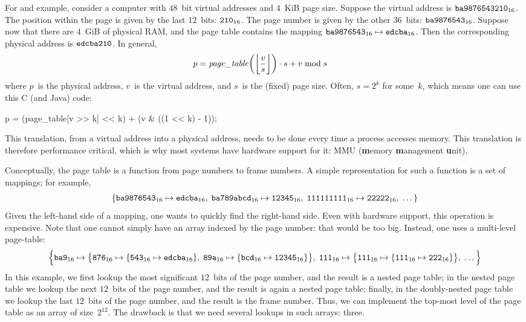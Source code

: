 \smallskip

For and example,
  consider a computer with $48$~bit virtual addresses and $4$~KiB page size.
Suppose the virtual address is ${\tt ba9876543210}_{16}$.
The position within the page is given by the last $12$~bits:
  ${\tt210}_{16}$.
The page number is given by the other $36$~bits:
  ${\tt ba9876543}_{16}$.
Suppose now that there are $4$~GiB of physical RAM,
  and the page table contains the mapping
  ${\tt ba9876543}_{16} \mapsto {\tt edcba}_{16}$.
Then the corresponding physical address is
  ${\tt edcba210}$.
In general,
\begin{align}
p &= {\it page\_table}\biggl(\biggl\lfloor\frac{v}{s}\biggr\rfloor\biggr) \cdot s
  + v \bmod s
  \label{eq:translation}
\end{align}
where $p$~is the physical address,
  $v$~is the virtual address,
  and $s$~is the (fixed) page size.
Often, $s=2^k$ for some~$k$, which means one can use this C (and Java) code:
\begin{ccode}
  p = (page_table[v >> k] << k) + (v & ((1 << k) - 1));
\end{ccode}
This translation, from a virtual address into a physical address,
  needs to be done every time a process accesses memory.
This translation is therefore performance critical,
  which is why most systems have hardware support for it:
  MMU ({\bf m}emory {\bf m}anagement {\bf u}nit).

Conceptually,
  the page table is a function from page numbers to frame numbers.
A simple representation for such a function is a set of mappings; for example,
\begin{align*}
  \{
  {\tt ba9876543}_{16} \mapsto {\tt edcba}_{16},\;
  {\tt ba789abcd}_{16} \mapsto {\tt 12345}_{16},\;
  {\tt 111111111}_{16} \mapsto {\tt 22222}_{16},\;
  \dots
  \}
\end{align*}
Given the left-hand side of a mapping, one wants to quickly find the right-hand side.
Even with hardware support, this operation is expensive.
Note that one cannot simply have an array indexed by the page number:
  that would be too big.
Instead, one uses a multi-level page-table:
\begin{align*}
  \Bigl\{
    {\tt ba9}_{16} \mapsto
      \bigl\{
        {\tt 876}_{16} \mapsto \{ {\tt 543}_{16} \mapsto {\tt edcba}_{16}\},\;
        {\tt 89a}_{16} \mapsto \{ {\tt bcd}_{16} \mapsto {\tt 12345}_{16}\}
      \bigr\},\;
    {\tt 111}_{16} \mapsto
      \bigl\{
        {\tt 111}_{16} \mapsto \{ {\tt 111}_{16} \mapsto {\tt 222}_{16} \}
      \bigr\},\;
    \dots
  \Bigr\}
\end{align*}
In this example, we first lookup the most significant $12$~bits of the page number,
  and the result is a nested page table;
  in the nested page table we lookup the next $12$~bits of the page number,
  and the result is again a nested page table;
  finally, in the doubly-nested page table we lookup the last $12$~bits of the page number,
  and the result is the frame number.
Thus,
  we can implement the top-most level of the page table as an array of size~$2^{12}$.
The drawback is that we need several lookups in such arrays: three.

